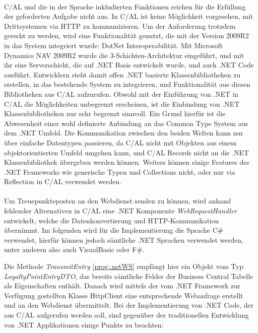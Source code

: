 \paragraph{}

C/AL und die in der Sprache inkludierten Funktionen reichen für die Erfüllung der geforderten Aufgabe nicht aus. In C/AL ist keine Möglichkeit vorgesehen, mit Drittsystemen via HTTP zu kommunizieren. Um der Anforderung trotzdem gerecht zu werden, wird eine Funktionalität genutzt, die mit der Version 2009R2 in das System integriert wurde: DotNet Interoperabilität. Mit Microsoft Dynamics NAV 2009R2 wurde die 3-Schichten-Architektur eingeführt, und mit ihr eine Serverschicht, die auf .NET Basis entwickelt wurde, und auch .NET Code ausführt. Entwicklern steht damit offen .NET basierte Klassenbibliotheken zu erstellen, in das bestehende System zu integrieren, und Funktionalität aus diesen Bibliotheken aus C/AL aufzurufen. Obwohl mit der Einführung von .NET in C/AL die Möglichkeiten unbegrenzt erscheinen, ist die Einbindung von .NET Klassenbibliotheken nur sehr begrenzt sinnvoll. Ein Grund hierfür ist die Abwesenheit einer wohl definierte Anbindung an das Common Type System aus dem .NET Umfeld. Die Kommunikation zwischen den beiden Welten kann nur über einfache Datentypen passieren, da C/AL nicht mit Objekten aus einem objektorientierten Umfeld umgehen kann, und C/AL Records nicht an die .NET Klassenbibliothek übergeben werden können. Weiters können einige Features des .NET Frameworks wie generische Typen und Collections nicht, oder nur via Reflection in C/AL verwendet werden. 
\paragraph{}

Um Treuepunkteposten an den Webdienst senden zu können, wird anhand fehlender Alternativen in C/AL eine .NET Komponente \textit{WebRequestHandler} entwickelt, welche die Datenkonvertierung und HTTP-Kommunikation übernimmt. Im folgenden wird für die Implementierung die Sprache C\# verwendet, hierfür können jedoch sämtliche .NET Sprachen verwendet werden, unter anderen also auch VisualBasic oder F\#.
\pagebreak

Die Methode \textit{TransmitEntry} \ref{prog:.netWS} empfängt hier ein Objekt vom Typ \textit{LoyaltyPointEntryDTO}, das bereits sämtliche Felder der Business Central Tabelle als Eigenschaften enthält. Danach wird mittels der vom .NET Framework zur Verfügung gestellten Klasse HttpClient eine entsprechende Webanfrage erstellt und an den Webdienst übermittelt. Bei der Implementierung von .NET Code, der aus C/AL aufgerufen werden soll, sind gegenüber der traditionellen Entwicklung von .NET Applikationen einige Punkte zu beachten:

